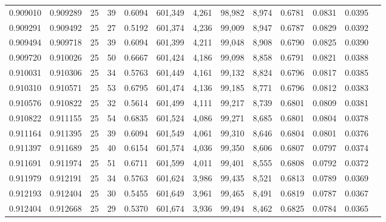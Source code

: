 \begin{tabular}{rrrrrrrrrrrrr}
0.909010 & 0.909289 &    25 &  39 &                                     0.6094 & 601,349 &   4,261 &  98,982 &   8,974 & 0.6781 & 0.0831 & 0.0395 \\
0.909291 & 0.909492 &    25 &  27 &                                     0.5192 & 601,374 &   4,236 &  99,009 &   8,947 & 0.6787 & 0.0829 & 0.0392 \\
0.909494 & 0.909718 &    25 &  39 &                                     0.6094 & 601,399 &   4,211 &  99,048 &   8,908 & 0.6790 & 0.0825 & 0.0390 \\
0.909720 & 0.910026 &    25 &  50 &                                     0.6667 & 601,424 &   4,186 &  99,098 &   8,858 & 0.6791 & 0.0821 & 0.0388 \\
0.910031 & 0.910306 &    25 &  34 &                                     0.5763 & 601,449 &   4,161 &  99,132 &   8,824 & 0.6796 & 0.0817 & 0.0385 \\
0.910310 & 0.910571 &    25 &  53 &                                     0.6795 & 601,474 &   4,136 &  99,185 &   8,771 & 0.6796 & 0.0812 & 0.0383 \\
0.910576 & 0.910822 &    25 &  32 &                                     0.5614 & 601,499 &   4,111 &  99,217 &   8,739 & 0.6801 & 0.0809 & 0.0381 \\
0.910822 & 0.911155 &    25 &  54 &                                     0.6835 & 601,524 &   4,086 &  99,271 &   8,685 & 0.6801 & 0.0804 & 0.0378 \\
0.911164 & 0.911395 &    25 &  39 &                                     0.6094 & 601,549 &   4,061 &  99,310 &   8,646 & 0.6804 & 0.0801 & 0.0376 \\
0.911397 & 0.911689 &    25 &  40 &                                     0.6154 & 601,574 &   4,036 &  99,350 &   8,606 & 0.6807 & 0.0797 & 0.0374 \\
0.911691 & 0.911974 &    25 &  51 &                                     0.6711 & 601,599 &   4,011 &  99,401 &   8,555 & 0.6808 & 0.0792 & 0.0372 \\
0.911979 & 0.912191 &    25 &  34 &                                     0.5763 & 601,624 &   3,986 &  99,435 &   8,521 & 0.6813 & 0.0789 & 0.0369 \\
0.912193 & 0.912404 &    25 &  30 &                                     0.5455 & 601,649 &   3,961 &  99,465 &   8,491 & 0.6819 & 0.0787 & 0.0367 \\
0.912404 & 0.912668 &    25 &  29 &                                     0.5370 & 601,674 &   3,936 &  99,494 &   8,462 & 0.6825 & 0.0784 & 0.0365 \\

\end{tabular}
